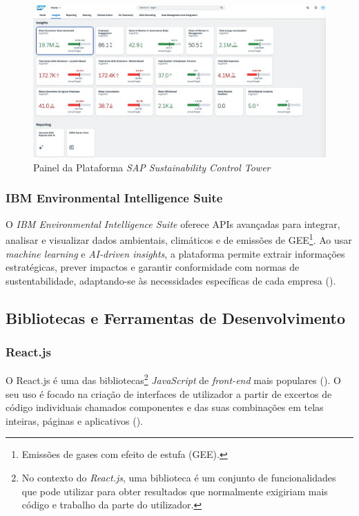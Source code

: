 \begin{figure}[h]
    \centering
    \includegraphics[width=5.75in]{frontmatter/assets/SAP.png}
    \caption{Painel da Plataforma \textit{SAP Sustainability Control Tower}}
    \label{fig:sap_sustainability_control_tower}
\end{figure}

\subsubsection{IBM Environmental Intelligence Suite}

O \textit{IBM Environmental Intelligence Suite} oferece APIs avançadas para integrar, analisar e visualizar dados ambientais, climáticos e de emissões de GEE\footnote{Emissões de gases com efeito de estufa (GEE).}. Ao usar \textit{machine learning} e \textit{AI-driven insights}, a plataforma permite extrair informações estratégicas, prever impactos e garantir conformidade com normas de sustentabilidade, adaptando-se às necessidades específicas de cada empresa (\cite{IBM2025}).

\subsection{Bibliotecas e Ferramentas de Desenvolvimento}
\label{subsec: BFD}

\subsubsection{React.js}

O React.js é uma das bibliotecas\footnote{No contexto do \textit{React.js}, uma biblioteca é um conjunto de funcionalidades que pode utilizar para obter resultados que normalmente exigiriam mais código e trabalho da parte do utilizador.} \textit{JavaScript} de \textit{front-end} mais populares (\cite{Schwarzmuller2022}). O seu uso é focado na criação de interfaces de utilizador a partir de excertos de código individuais chamados componentes e das suas combinações em telas inteiras, páginas e aplicativos (\cite{React2025}).

